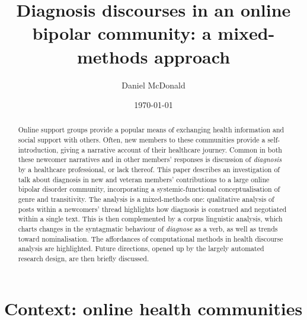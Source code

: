 \documentclass{article}
\author{Daniel McDonald}
\date{\today}
\title{Diagnosis discourses in an online bipolar community: a mixed-methods approach}
\begin{document}
\maketitle


\begin{abstract}
Online support groups provide a popular means of exchanging health information and social support with others. Often, new members to these communities provide a self-introduction, giving a narrative account of their healthcare journey. Common in both these newcomer narratives and in other members' responses is discussion of \emph{diagnosis} by a healthcare professional, or lack thereof. This paper describes an investigation of talk about diagnosis in new and veteran members' contributions to a large online bipolar disorder community, incorporating a systemic-functional conceptualisation of genre and transitivity. The analysis is a mixed-methods one: qualitative analysis of posts within a newcomers' thread highlights how diagnosis is construed and negotiated within a single text. This is then complemented by a corpus linguistic analysis, which charts changes in the syntagmatic behaviour of \emph{diagnose} as a verb, as well as trends toward nominalisation. The affordances of computational methods in health discourse analysis are highlighted. Future directions, opened up by the largely automated research design, are then briefly discussed.
\end{abstract}

\section{Context: online health communities}
\end{document}
